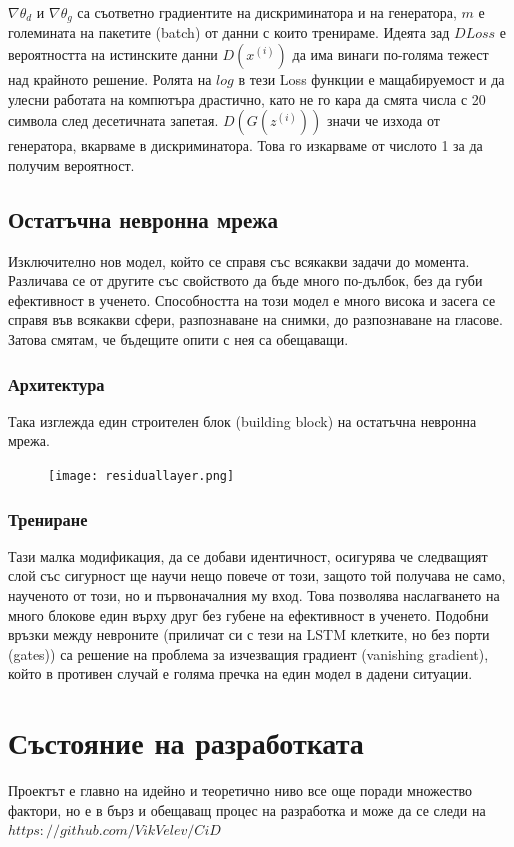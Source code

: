 $\nabla \theta_d$ и $\nabla \theta_g$ са съответно градиентите на дискриминатора и на генератора, $m$ е големината на пакетите (batch) от данни с които тренираме. Идеята зад $DLoss$ е вероятността на истинските данни $D(x^{(i)})$ да има винаги по-голяма тежест над крайното решение. Ролята на $log$ в тези Loss функции е мащабируемост и да улесни работата на компютъра драстично, като не го кара да смята числа с 20 символа след десетичната запетая. $D(G(z^{(i)}))$ значи че изхода от генератора, вкарваме в дискриминатора. Това го изкарваме от числото 1 за да получим вероятност.

\subsection{Остатъчна невронна мрежа}
Изключително нов модел, който се справя със всякакви задачи до момента. Различава се от другите със свойството да бъде много по-дълбок, без да губи ефективност в ученето. Способността на този модел е много висока и засега се справя във всякакви сфери, разпознаване на снимки, до разпознаване на гласове. Затова смятам, че бъдещите опити с нея са обещаващи.

\subsubsection{Архитектура}
Така изглежда един строителен блок (building block) на остатъчна невронна мрежа.
\begin{center}
\begin{figure}[h]
    \centering
    \texttt{[image: residuallayer.png]}
\end{figure}
\end{center}

\subsubsection{Трениране}

Тази малка модификация, да се добави идентичност, осигурява че следващият слой със сигурност ще научи нещо повече от този, защото той получава не само, наученото от този, но и първоначалния му вход. Това позволява наслагването на много блокове един върху друг без губене на ефективност в ученето. Подобни връзки между невроните (приличат си с тези на LSTM клетките, но без порти (gates)) са решение на проблема за изчезващия градиент (vanishing gradient), който в противен случай е голяма пречка на един модел в дадени ситуации.

\section{Състояние на разработката}
Проектът е главно на идейно и теоретично ниво все още поради множество фактори, но е в бърз и обещаващ процес на разработка и може да се следи на $https://github.com/VikVelev/CiD$

